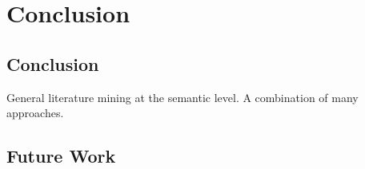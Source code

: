 \chapter{Conclusion}  %

\ifpdf
    \graphicspath{{Conclusion/Figs/Raster/}{Conclusion/Figs/PDF/}{Conclusion/Figs/}}
\else
    \graphicspath{{Conclusion/Figs/Vector/}{Conclusion/Figs/}}
\fi

\section{Conclusion} %
General literature mining at the semantic level. A combination of many approaches.

\section{Future Work}
